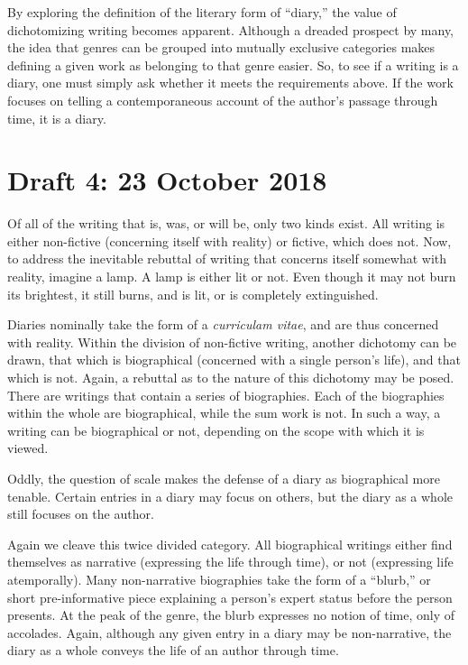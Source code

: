 \documentclass[12pt]{article}[titlepage]
\newcommand{\say}[1]{``#1''}
\newcommand{\1}{\={a}}
\newcommand{\2}{\={e}}
\newcommand{\3}{\={\i}}
\newcommand{\4}{\=o}
\newcommand{\5}{\=u}
\newcommand{\6}{\={A}}
\renewcommand{\,}{\textsuperscript{,}}
\begin{document}
By exploring the definition of the literary form of \say{diary,} the value of dichotomizing writing becomes apparent.
Although a dreaded prospect by many, the idea that genres can be grouped into mutually exclusive categories makes defining a given work as belonging to that genre easier.
So, to see if a writing is a diary, one must simply ask whether it meets the requirements above.
If the work focuses on telling a contemporaneous account of the author's passage through time, it is a diary. 
 
\section{Draft 4: 23 October 2018}
Of all of the writing that is, was, or will be, only two kinds exist.
All writing is either non-fictive (concerning itself with reality) or fictive, which does not.
Now, to address the inevitable rebuttal of writing that concerns itself somewhat with reality, imagine a lamp.
A lamp is either lit or not.
Even though it may not burn its brightest, it still burns, and is lit, or is completely extinguished.

Diaries nominally take the form of a \textit{curriculam vitae}, and are thus concerned with reality.
Within the division of non-fictive writing, another dichotomy can be drawn, that which is biographical (concerned with a single person's life), and that which is not.
Again, a rebuttal as to the nature of this dichotomy may be posed.
There are writings that contain a series of biographies.
Each of the biographies within the whole are biographical, while the sum work is not.
In such a way, a writing can be biographical or not, depending on the scope with which it is viewed.

Oddly, the question of scale makes the defense of a diary as biographical more tenable.
Certain entries in a diary may focus on others, but the diary as a whole still focuses on the author.

Again we cleave this twice divided category.
All biographical writings either find themselves as narrative (expressing the life through time), or not (expressing life atemporally).
Many non-narrative biographies take the form of a \say{blurb,} or short pre-informative piece explaining a person's expert status before the person presents.
At the peak of the genre, the blurb expresses no notion of time, only of accolades.
Again, although any given entry in a diary may be non-narrative, the diary as a whole conveys the life of an author through time.
\end{document}
